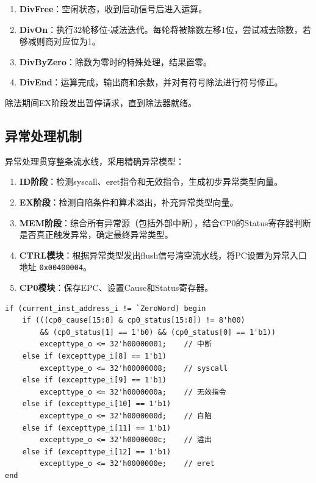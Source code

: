 \begin{enumerate}[leftmargin=2em]
    \item \textbf{DivFree}：空闲状态，收到启动信号后进入运算。
    \item \textbf{DivOn}：执行32轮移位-减法迭代。每轮将被除数左移1位，尝试减去除数，若够减则商对应位为1。
    \item \textbf{DivByZero}：除数为零时的特殊处理，结果置零。
    \item \textbf{DivEnd}：运算完成，输出商和余数，并对有符号除法进行符号修正。
\end{enumerate}

除法期间EX阶段发出暂停请求，直到除法器就绪。

\subsection{异常处理机制}

异常处理贯穿整条流水线，采用精确异常模型：

\begin{enumerate}[leftmargin=2em]
    \item \textbf{ID阶段}：检测syscall、eret指令和无效指令，生成初步异常类型向量。
    \item \textbf{EX阶段}：检测自陷条件和算术溢出，补充异常类型向量。
    \item \textbf{MEM阶段}：综合所有异常源（包括外部中断），结合CP0的Status寄存器判断是否真正触发异常，确定最终异常类型。
    \item \textbf{CTRL模块}：根据异常类型发出flush信号清空流水线，将PC设置为异常入口地址 \texttt{0x00400004}。
    \item \textbf{CP0模块}：保存EPC、设置Cause和Status寄存器。
\end{enumerate}

\begin{lstlisting}[caption={MEM阶段异常判定逻辑}]
if (current_inst_address_i != `ZeroWord) begin
    if (((cp0_cause[15:8] & cp0_status[15:8]) != 8'h00)
        && (cp0_status[1] == 1'b0) && (cp0_status[0] == 1'b1))
        excepttype_o <= 32'h00000001;    // 中断
    else if (excepttype_i[8] == 1'b1)
        excepttype_o <= 32'h00000008;    // syscall
    else if (excepttype_i[9] == 1'b1)
        excepttype_o <= 32'h0000000a;    // 无效指令
    else if (excepttype_i[10] == 1'b1)
        excepttype_o <= 32'h0000000d;    // 自陷
    else if (excepttype_i[11] == 1'b1)
        excepttype_o <= 32'h0000000c;    // 溢出
    else if (excepttype_i[12] == 1'b1)
        excepttype_o <= 32'h0000000e;    // eret
end
\end{lstlisting}

